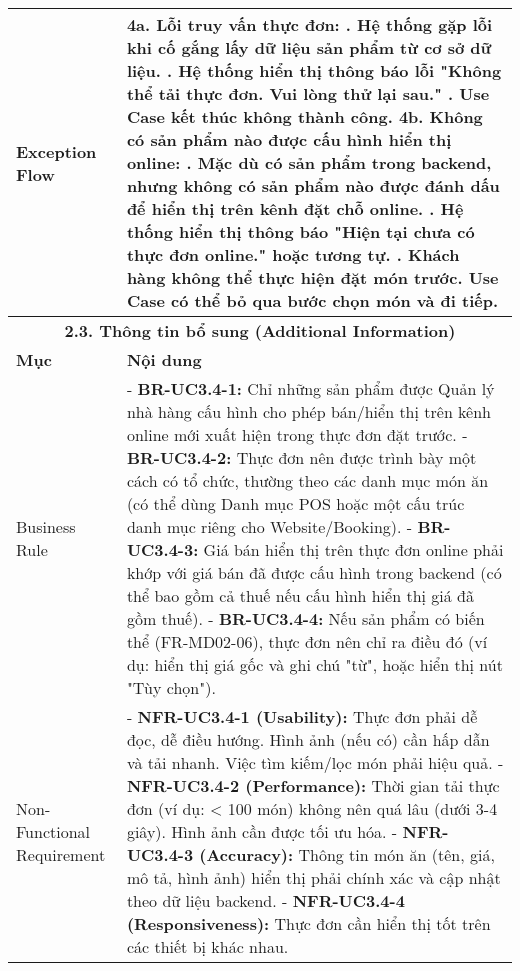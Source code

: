 \begin{longtable}{|m{4cm}|p{11cm}|}
Exception Flow & \textbf{4a. Lỗi truy vấn thực đơn:} \newline    1. Hệ thống gặp lỗi khi cố gắng lấy dữ liệu sản phẩm từ cơ sở dữ liệu. \newline    2. Hệ thống hiển thị thông báo lỗi "Không thể tải thực đơn. Vui lòng thử lại sau." \newline    3. Use Case kết thúc không thành công. \newline \textbf{4b. Không có sản phẩm nào được cấu hình hiển thị online:} \newline    1. Mặc dù có sản phẩm trong backend, nhưng không có sản phẩm nào được đánh dấu để hiển thị trên kênh đặt chỗ online. \newline    2. Hệ thống hiển thị thông báo "Hiện tại chưa có thực đơn online." hoặc tương tự. \newline    3. Khách hàng không thể thực hiện đặt món trước. Use Case có thể bỏ qua bước chọn món và đi tiếp. \\
\hline
\multicolumn{2}{|c|}{\textbf{2.3. Thông tin bổ sung (Additional Information)}} \\
\hline
\textbf{Mục} & \textbf{Nội dung} \\
\hline
Business Rule & - \textbf{BR-UC3.4-1:} Chỉ những sản phẩm được Quản lý nhà hàng cấu hình cho phép bán/hiển thị trên kênh online mới xuất hiện trong thực đơn đặt trước. \newline - \textbf{BR-UC3.4-2:} Thực đơn nên được trình bày một cách có tổ chức, thường theo các danh mục món ăn (có thể dùng Danh mục POS hoặc một cấu trúc danh mục riêng cho Website/Booking). \newline - \textbf{BR-UC3.4-3:} Giá bán hiển thị trên thực đơn online phải khớp với giá bán đã được cấu hình trong backend (có thể bao gồm cả thuế nếu cấu hình hiển thị giá đã gồm thuế). \newline - \textbf{BR-UC3.4-4:} Nếu sản phẩm có biến thể (FR-MD02-06), thực đơn nên chỉ ra điều đó (ví dụ: hiển thị giá gốc và ghi chú "từ", hoặc hiển thị nút "Tùy chọn"). \\
\hline
Non-Functional Requirement & - \textbf{NFR-UC3.4-1 (Usability):} Thực đơn phải dễ đọc, dễ điều hướng. Hình ảnh (nếu có) cần hấp dẫn và tải nhanh. Việc tìm kiếm/lọc món phải hiệu quả. \newline - \textbf{NFR-UC3.4-2 (Performance):} Thời gian tải thực đơn (ví dụ: < 100 món) không nên quá lâu (dưới 3-4 giây). Hình ảnh cần được tối ưu hóa. \newline - \textbf{NFR-UC3.4-3 (Accuracy):} Thông tin món ăn (tên, giá, mô tả, hình ảnh) hiển thị phải chính xác và cập nhật theo dữ liệu backend. \newline - \textbf{NFR-UC3.4-4 (Responsiveness):} Thực đơn cần hiển thị tốt trên các thiết bị khác nhau. \\
\hline
\end{longtable}

